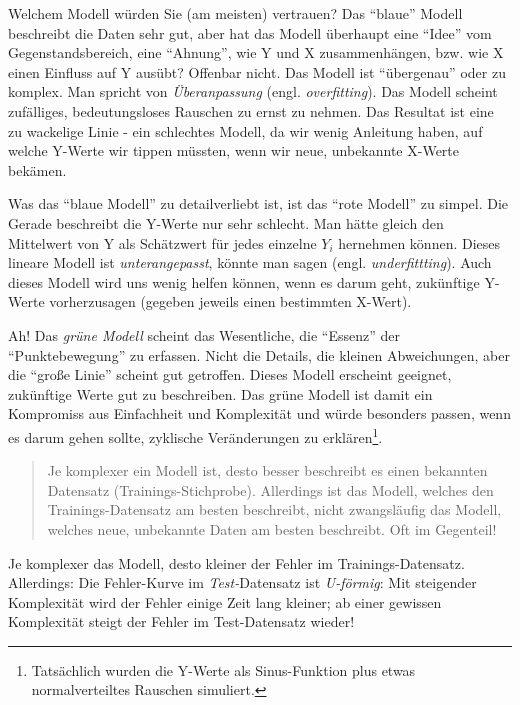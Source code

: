 \documentclass[12pt,]{book}
\let\rmarkdownfootnote\footnote%
\def\footnote{\protect\rmarkdownfootnote}
\begin{document}
Welchem Modell würden Sie (am meisten) vertrauen? Das ``blaue'' Modell
beschreibt die Daten sehr gut, aber hat das Modell überhaupt eine
``Idee'' vom Gegenstandsbereich, eine ``Ahnung'', wie Y und X
zusammenhängen, bzw. wie X einen Einfluss auf Y ausübt? Offenbar nicht.
Das Modell ist ``übergenau'' oder zu komplex. Man spricht von
\emph{Überanpassung} (engl.
\emph{overfitting}). Das Modell scheint zufälliges,
bedeutungsloses Rauschen zu ernst zu nehmen. Das Resultat ist eine zu
wackelige Linie - ein schlechtes Modell, da wir wenig Anleitung haben,
auf welche Y-Werte wir tippen müssten, wenn wir neue, unbekannte X-Werte
bekämen.

Was das ``blaue Modell'' zu detailverliebt ist, ist das ``rote Modell''
zu simpel. Die Gerade beschreibt die Y-Werte nur sehr schlecht. Man
hätte gleich den Mittelwert von Y als Schätzwert für jedes einzelne
\(Y_i\) hernehmen können. Dieses lineare Modell ist
\emph{unterangepasst}, könnte man sagen (engl.
\emph{underfittting}). Auch dieses Modell wird uns
wenig helfen können, wenn es darum geht, zukünftige Y-Werte
vorherzusagen (gegeben jeweils einen bestimmten X-Wert).

Ah! Das \emph{grüne Modell} scheint das Wesentliche, die ``Essenz'' der
``Punktebewegung'' zu erfassen. Nicht die Details, die kleinen
Abweichungen, aber die ``große Linie'' scheint gut getroffen. Dieses
Modell erscheint geeignet, zukünftige Werte gut zu beschreiben. Das
grüne Modell ist damit ein Kompromiss aus Einfachheit und Komplexität
und würde besonders passen, wenn es darum gehen sollte, zyklische
Veränderungen zu erklären\footnote{Tatsächlich wurden die Y-Werte als
  Sinus-Funktion plus etwas normalverteiltes Rauschen simuliert.}.

\begin{quote}
Je komplexer ein Modell ist, desto besser beschreibt es einen bekannten
Datensatz (Trainings-Stichprobe). Allerdings ist das Modell, welches den
Trainings-Datensatz am besten beschreibt, nicht zwangsläufig das Modell,
welches neue, unbekannte Daten am besten beschreibt. Oft im Gegenteil!
\end{quote}

Je komplexer das Modell, desto kleiner der Fehler im
Trainings-Datensatz. Allerdings: Die Fehler-Kurve im
\emph{Test-}Datensatz ist \emph{U-förmig}: Mit steigender Komplexität
wird der Fehler einige Zeit lang kleiner; ab einer gewissen Komplexität
steigt der Fehler im Test-Datensatz wieder!
\end{document}
